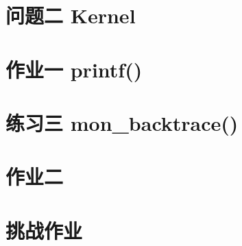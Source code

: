 \documentclass[12pt,a4paper,UTF8]{article}
\begin{document}
    \subsection{}


\section{问题二 Kernel}

    \subsection{}

    \subsection{}


\section{作业一 printf()}


\section{练习三 mon\_backtrace()}


\section{作业二}


\section{挑战作业}



\end{document}
